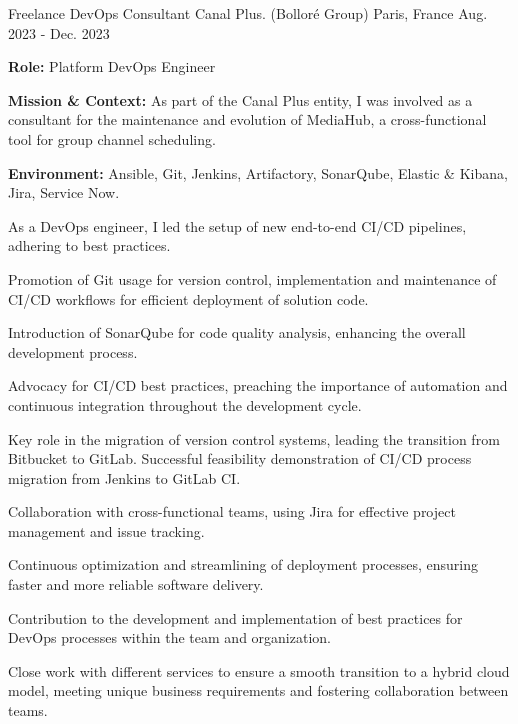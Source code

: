 \begin{cventries}
\cventry
{Freelance DevOps Consultant} %
{Canal Plus. (Bolloré Group)} %
{Paris, France} %
{Aug. 2023 - Dec. 2023} %
{
  \begin{cvitems} %
    \item {\textbf{Role:} Platform DevOps Engineer}
    \item {\textbf{Mission \& Context:} As part of the Canal Plus entity, I was involved as a consultant for the maintenance and evolution of MediaHub, a cross-functional tool for group channel scheduling.}
    \item {\textbf{Environment:} Ansible, Git, Jenkins, Artifactory, SonarQube, Elastic \& Kibana, Jira, Service Now.}
    \item {As a DevOps engineer, I led the setup of new end-to-end CI/CD pipelines, adhering to best practices.}
    \item {Promotion of Git usage for version control, implementation and maintenance of CI/CD workflows for efficient deployment of solution code.}
    \item {Introduction of SonarQube for code quality analysis, enhancing the overall development process.}
    \item {Advocacy for CI/CD best practices, preaching the importance of automation and continuous integration throughout the development cycle.}
    \item {Key role in the migration of version control systems, leading the transition from Bitbucket to GitLab. Successful feasibility demonstration of CI/CD process migration from Jenkins to GitLab CI.}
    \item {Collaboration with cross-functional teams, using Jira for effective project management and issue tracking.}
    \item {Continuous optimization and streamlining of deployment processes, ensuring faster and more reliable software delivery.}
    \item {Contribution to the development and implementation of best practices for DevOps processes within the team and organization.}
    \item {Close work with different services to ensure a smooth transition to a hybrid cloud model, meeting unique business requirements and fostering collaboration between teams.}
  \end{cvitems}        
}


\end{cventries}
